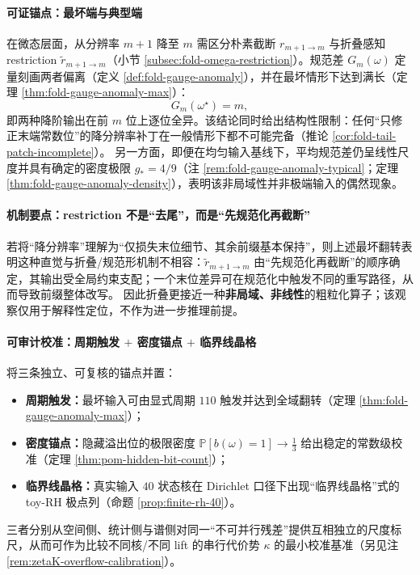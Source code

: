 \paragraph{可证锚点：最坏端与典型端}
在微态层面，从分辨率 \(m+1\) 降至 \(m\) 需区分朴素截断 \(r_{m+1\to m}\) 与折叠感知 restriction \(\widetilde r_{m+1\to m}\)（小节 \ref{subsec:fold-omega-restriction}）。规范差 \(G_m(\omega)\) 定量刻画两者偏离（定义 \ref{def:fold-gauge-anomaly}），并在最坏情形下达到满长（定理 \ref{thm:fold-gauge-anomaly-max}）：
\[
G_m(\omega^\star)=m,
\]
即两种降阶输出在前 \(m\) 位上逐位全异。该结论同时给出结构性限制：任何“只修正末端常数位”的降分辨率补丁在一般情形下都不可能完备（推论 \ref{cor:fold-tail-patch-incomplete}）。
另一方面，即便在均匀输入基线下，平均规范差仍呈线性尺度并具有确定的密度极限 \(g_\ast=4/9\)（注 \ref{rem:fold-gauge-anomaly-typical}；定理 \ref{thm:fold-gauge-anomaly-density}），表明该非局域性并非极端输入的偶然现象。

\paragraph{机制要点：restriction 不是“去尾”，而是“先规范化再截断”}
若将“降分辨率”理解为“仅损失末位细节、其余前缀基本保持”，则上述最坏翻转表明这种直觉与折叠/规范形机制不相容：\(\widetilde r_{m+1\to m}\) 由“先规范化再截断”的顺序确定，其输出受全局约束支配；一个末位差异可在规范化中触发不同的重写路径，从而导致前缀整体改写。
因此折叠更接近一种\textbf{非局域、非线性}的粗粒化算子；该观察仅用于解释性定位，不作为进一步推理前提。

\paragraph{可审计校准：周期触发 \texorpdfstring{$+$}{+} 密度锚点 \texorpdfstring{$+$}{+} 临界线晶格}
将三条独立、可复核的锚点并置：
\begin{itemize}
  \item \textbf{周期触发：}最坏输入可由显式周期 \(110\) 触发并达到全域翻转（定理 \ref{thm:fold-gauge-anomaly-max}）；
  \item \textbf{密度锚点：}隐藏溢出位的极限密度 \(\mathbb{P}[b(\omega)=1]\to \frac13\) 给出稳定的常数级校准（定理 \ref{thm:pom-hidden-bit-count}）；
  \item \textbf{临界线晶格：}真实输入 \(40\) 状态核在 Dirichlet 口径下出现“临界线晶格”式的 toy-RH 极点列（命题 \ref{prop:finite-rh-40}）。
\end{itemize}
三者分别从空间侧、统计侧与谱侧对同一“不可并行残差”提供互相独立的尺度标尺，从而可作为比较不同核/不同 lift 的串行代价势 \(\kappa\) 的最小校准基准（另见注 \ref{rem:zetaK-overflow-calibration}）。

